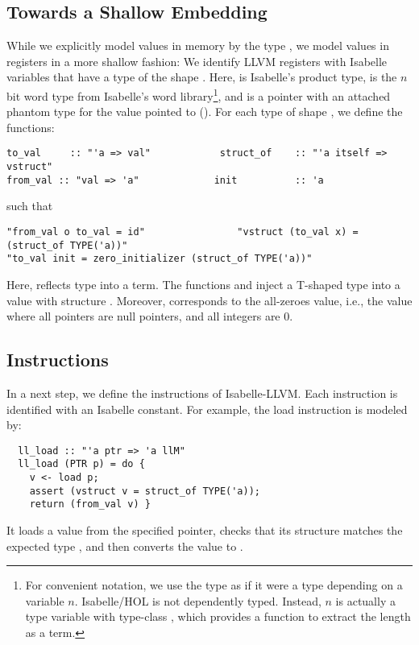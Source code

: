 \documentclass[a4paper,USenglish,cleveref, autoref]{lipics-v2019}
\begin{document}
\subsection{Towards a Shallow Embedding}
While we explicitly model values in memory by the type , we model values in registers in a more shallow fashion:
We identify LLVM registers with Isabelle variables that have a type of the shape . 
Here, \q{\is{\x}} is Isabelle's product type,  is the $n$ bit word type from Isabelle's word 
library\cprotect\footnote{For convenient notation, we use the type  as if it were a type depending on a variable $n$. 
Isabelle/HOL is not dependently typed. Instead, $n$ is actually a type variable with type-class , which provides a 
function  to extract the length as a term.}, 
and  is a pointer with an attached phantom type for the value pointed to ().
%
For each type  of shape , we define the functions:
\begin{lstlisting}
to_val     :: "'a => val"            struct_of    :: "'a itself => vstruct"
from_val :: "val => 'a"             init          :: 'a
\end{lstlisting}
such that
\begin{lstlisting}
"from_val o to_val = id"                "vstruct (to_val x) = (struct_of TYPE('a))"
"to_val init = zero_initializer (struct_of TYPE('a))"
\end{lstlisting}
Here,  reflects type  into a term.
The functions  and  inject a T-shaped type  into a value with structure .
Moreover,  corresponds to the all-zeroes value, i.e., the value where all pointers are null pointers, and all integers are $0$.

\subsection{Instructions}
In a next step, we define the instructions of Isabelle-LLVM. Each instruction is identified with an Isabelle constant. For example, the load instruction
is modeled by:
\begin{lstlisting}
  ll_load :: "'a ptr => 'a llM"
  ll_load (PTR p) = do {
    v <- load p;
    assert (vstruct v = struct_of TYPE('a));
    return (from_val v) }
\end{lstlisting}
It loads a value from the specified pointer, checks that its structure matches the expected type , and then 
converts the value to . 
\end{document}
